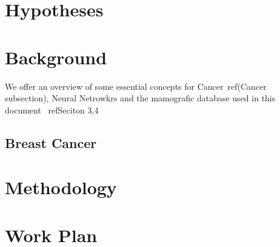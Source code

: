 \documentclass[11pt]{article}
\begin{document}
\section{Hypotheses}


\section{Background}
We offer an overview of some essential concepts for Cancer~ref(Cancer subsection), Neural Netrowkrs and the mamografic database used in this document~ ref{Seciton 3,4}

	\subsection{Breast Cancer}
	






\section{Methodology}


\section{Work Plan}




\end{document}
